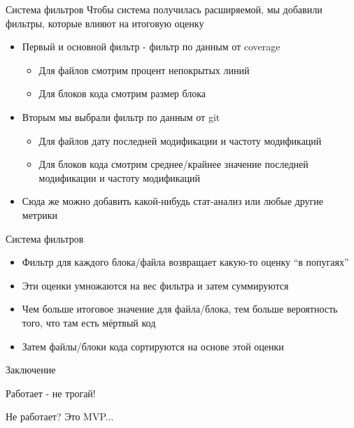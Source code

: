 \documentclass[aspectratio=169]{beamer}
\begin{document}
\begin{frame}{Система фильтров}
    Чтобы система получилась расширяемой, мы добавили фильтры, которые влияют на итоговую оценку
    \begin{itemize}
        \item Первый и основной фильтр - фильтр по данным от coverage
              \begin{itemize}
                  \item Для файлов смотрим процент непокрытых линий
                  \item Для блоков кода смотрим размер блока
              \end{itemize}
        \item Вторым мы выбрали фильтр по данным от git
              \begin{itemize}
                  \item Для файлов дату последней модификации и частоту модификаций
                  \item Для блоков кода смотрим среднее/крайнее значение последней модификации и частоту модификаций
              \end{itemize}
        \item Сюда же можно добавить какой-нибудь стат-анализ или любые другие метрики
    \end{itemize}
\end{frame}


\begin{frame}{Система фильтров}
    \begin{itemize}
        \item Фильтр для каждого блока/файла возвращает какую-то оценку ``в попугаях''
        \item Эти оценки умножаются на вес фильтра и затем суммируются
        \item Чем больше итоговое значение для файла/блока, тем больше вероятность того, что там есть мёртвый код
        \item Затем файлы/блоки кода сортируются на основе этой оценки
    \end{itemize}
\end{frame}

\begin{frame}{Заключение}
    \begin{center}
        Работает - не трогай!

        Не работает? Это MVP...
    \end{center}
\end{frame}
\end{document}
